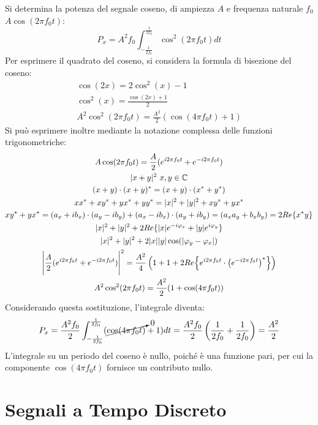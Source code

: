 \documentclass{article}
\numberwithin{equation}{subsection}
\begin{document}
Si determina la potenza del segnale coseno, di ampiezza $A$ e frequenza naturale $f_0$ $A\cos\left(2\pi f_0t\right)$:
\begin{equation*}
    P_x=\displaystyle A^2f_0\int_{-\frac{1}{2f_0}}^{\frac{1}{2f_0}}\cos^2(2\pi f_0 t)dt
\end{equation*}
Per esprimere il quadrato del coseno, si considera la formula di bisezione del coseno:
\begin{gather*}
    \cos(2x)=2\cos^2(x)-1\\
    \cos^2(x)=\displaystyle\frac{\cos(2x)+1}{2}\\
    A^2\cos^2(2\pi f_0t)=\displaystyle\frac{A^2}{2}(\cos(4\pi f_0t)+1)
\end{gather*}
Si può esprimere inoltre mediante la notazione complessa delle funzioni trigonometriche:
\begin{gather*}
    A\cos(2\pi f_0t)=\displaystyle\frac{A}{2}(e^{i2\pi f_0t}+e^{-i2\pi f_0t})\\
    |x+y|^2\,\,x,y\in\mathbb{C}\\
    (x+y)\cdot(x+y)^*=(x+y)\cdot(x^*+y^*)\\
    xx^*+xy^*+yx^*+yy^*=|x|^2+|y|^2+xy^*+yx^*\\
    xy^*+yx^*=(a_x+ib_x)\cdot(a_y-ib_y)+(a_x-ib_x)\cdot(a_y+ib_y)=(a_xa_y+b_xb_y)=2Re\{x^*y\}\\
    |x|^2+|y|^2+2Re\{|x|e^{-i\varphi_x}+|y|e^{i\varphi_y}\}\\
    |x|^2+|y|^2+2|x||y|\cos(|\varphi_y-\varphi_x|)\\
    \Bigg|\displaystyle\frac{A}{2}(e^{i2\pi f_0t}+e^{-i2\pi f_0t})\Bigg|^2=\frac{A^2}{4}\left(1+1+2Re\Bigl\{e^{i2\pi f_0t}\cdot\left(e^{-i2\pi f_0t}\right)^*\Bigr\}\right)\\
    A^2\cos^2(2\pi f_0t)=\displaystyle\frac{A^2}{2}(1+\cos(4\pi f_0t))
\end{gather*}
Considerando questa sostituzione, l'integrale diventa:
\begin{equation*}
    P_x=\displaystyle\frac{A^2f_0}{2}\int_{-\frac{1}{2f_0}}^{\frac{1}{2f_0}}(\cancelto{0}{\cos(4\pi f_0 t)}+1)dt=\frac{A^2f_0}{2}\left(\frac{1}{2f_0}+\frac{1}{2f_0}\right)=\frac{A^2}{2}
\end{equation*}
L'integrale su un periodo del coseno è nullo, poiché è una funzione pari, per cui la componente $\cos(4\pi f_0 t)$ fornisce un contributo nullo. 

\clearpage

\section{Segnali a Tempo Discreto}
\end{document}
